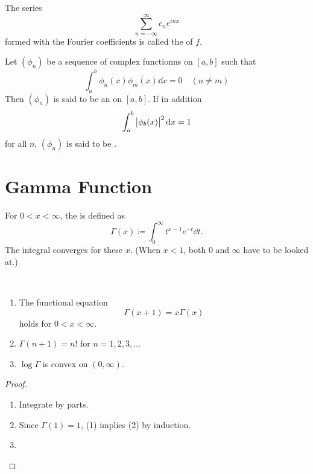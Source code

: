 \begin{definition}
The series
\[\sum_{n=-\infty}^{\infty}c_ne^{inx}\]
formed with the Fourier coefficients is called the  of $f$.
\end{definition}

\begin{definition}
Let $(\phi_n)$ be a sequence of complex functionns on $[a,b]$ such that
\[\int_{a}^{b}\phi_n(x)\overline{\phi_m(x)}\dd{x}=0\quad(n\neq m)\]
Then $(\phi_n)$ is said to be an  on $[a,b]$. If in addition
\[\int_{a}^{b}\left|\phi_b(x)\right|^2\dd{x}=1\]
for all $n$, $(\phi_n)$ is said to be .
\end{definition}

\section{Gamma Function}
\begin{definition}
For $0<x<\infty$, the  is defined as
\begin{equation}
\Gamma(x)\coloneqq\int_0^\infty t^{x-1}e^{-t}\dd{t}.
\end{equation}
The integral converges for these $x$. (When $x<1$, both $0$ and $\infty$ have to be looked at.)
\end{definition}

\begin{lemma} \
\begin{enumerate}[label=(\arabic*)]
\item The functional equation
\[\Gamma(x+1)=x\Gamma(x)\]
holds for $0<x<\infty$.
\item $\Gamma(n+1)=n!$ for $n=1,2,3,\dots$
\item $\log\Gamma$ is convex on $(0,\infty)$.
\end{enumerate}
\end{lemma}

\begin{proof} \
\begin{enumerate}[label=(\arabic*)]
\item Integrate by parts.
\item Since $\Gamma(1)=1$, (1) implies (2) by induction.
\item 
\end{enumerate}
\end{proof}

